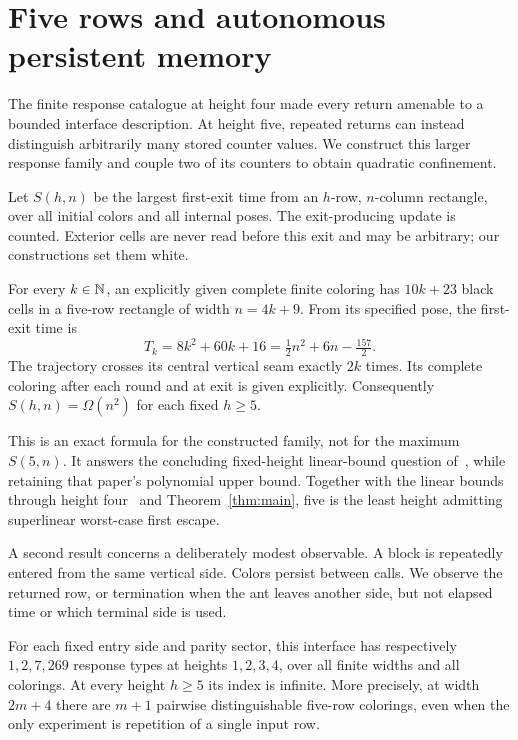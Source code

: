 \section{Five rows and autonomous persistent memory}\label{sec:five}
The finite response catalogue at height four made every return amenable to
a bounded interface description. At height five, repeated returns can instead
distinguish arbitrarily many stored counter values. We construct this larger
response family and couple two of its counters to obtain quadratic confinement.

Let $S(h,n)$ be the largest first-exit time from an $h$-row, $n$-column
rectangle, over all initial colors and all internal poses. The exit-producing
update is counted. Exterior cells are never read before this exit and may be
arbitrary; our constructions set them white.

\begin{theorem}\label{five:thm:quadratic}
For every $k\in\mathbb N$, an explicitly given complete finite coloring has $10k+23$
black cells in a five-row rectangle of width $n=4k+9$. From its specified pose,
the first-exit time is
\[
 T_k=8k^2+60k+16=\tfrac12 n^2+6n-\tfrac{157}{2}.
\]
The trajectory crosses its central vertical seam exactly $2k$ times. Its complete
coloring after each round and at exit is given explicitly. Consequently
$S(h,n)=\Omega(n^2)$ for each fixed $h\ge5$.
\end{theorem}

This is an exact formula for the constructed family, not for the maximum
$S(5,n)$. It answers the concluding fixed-height linear-bound question
of~\cite{etse}, while retaining that paper's polynomial upper bound.
Together with the linear bounds through height four~\cite{etse} and Theorem~\ref{thm:main}, five
is the least height admitting superlinear worst-case first escape.

A second result concerns a deliberately modest observable. A block is repeatedly
entered from the same vertical side. Colors persist between calls. We observe
the returned row, or termination when the ant leaves another side, but not elapsed
time or which terminal side is used.
\begin{theorem}\label{five:thm:index}
For each fixed entry side and parity sector, this interface has respectively
$1,2,7,269$ response types at heights $1,2,3,4$, over all finite widths and all
colorings. At every height $h\ge5$ its index is infinite. More precisely, at
width $2m+4$ there are $m+1$ pairwise distinguishable five-row colorings, even
when the only experiment is repetition of a single input row.
\end{theorem}


